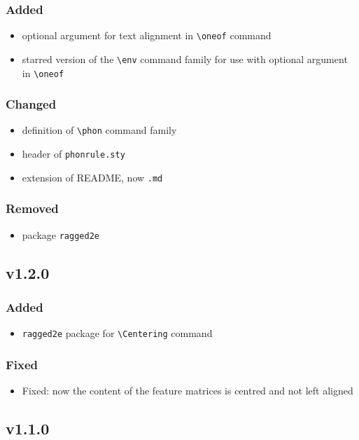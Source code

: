 \documentclass[a4paper]{article}
\begin{document}
\subsubsection*{Added}
\begin{itemize}
    \item optional argument for text alignment in \verb+\oneof+ command
    \item starred version of the \verb+\env+ command family for use with optional argument in \verb+\oneof+
\end{itemize}
\subsubsection*{Changed}
\begin{itemize}
    \item definition of \verb+\phon+ command family
    \item header of \texttt{phonrule.sty}
    \item extension of README, now \texttt{.md}
\end{itemize}
\subsubsection*{Removed}
\begin{itemize}
    \item package \texttt{ragged2e}
\end{itemize}

\subsection*{v1.2.0}
\subsubsection*{Added}
\begin{itemize}
\item \texttt{ragged2e} package for \verb+\Centering+ command
\end{itemize}
\subsubsection*{Fixed}
\begin{itemize}
\item Fixed: now the content of the feature matrices is centred and not left aligned
\end{itemize}

\subsection*{v1.1.0}
\end{document}

